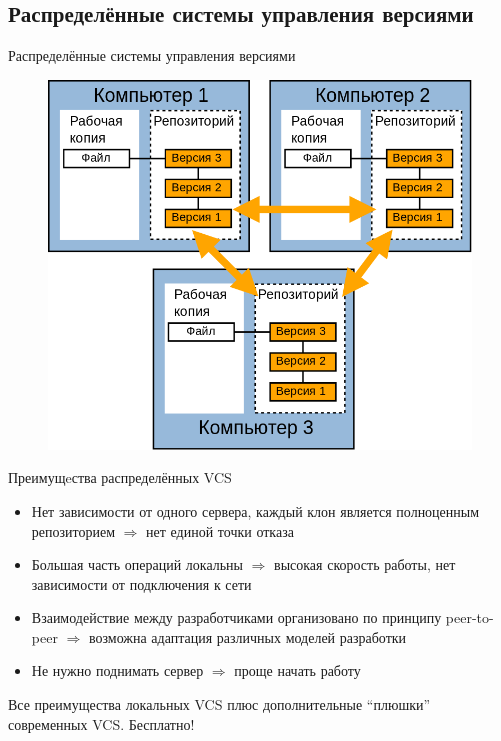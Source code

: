 \documentclass[presentation]{beamer}
\begin{document}


\subsection{Распределённые системы управления версиями}

\begin{frame}{Распределённые системы управления версиями}
  \begin{figure}[htb]
    \centering
    \includegraphics[height=.9\textheight]{vcs-decentralized}
  \end{figure}
\end{frame}

\begin{frame}{Преимущeства распределённых VCS}
  \begin{itemize}
  \item Нет зависимости от одного сервера, каждый клон является
    полноценным репозиторием $\Rightarrow$ нет единой точки отказа
  \item Большая часть операций локальны $\Rightarrow$ высокая скорость
    работы, нет зависимости от подключения к сети
  \item Взаимодействие между разработчиками организовано по принципу
    peer-to-peer $\Rightarrow$ возможна адаптация различных моделей
    разработки
  \item Не нужно поднимать сервер $\Rightarrow$ проще начать работу
  \end{itemize}
  \medskip
  \centering
  \LARGE Все преимущества локальных VCS плюс дополнительные ``плюшки''
  современных VCS.  Бесплатно!
\end{frame}
\end{document}
